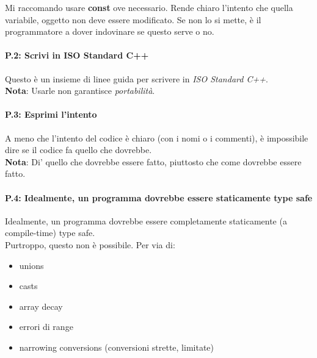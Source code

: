 \textsf{\small Mi raccomando usare \textbf{const} ove necessario. Rende chiaro l'intento che quella variabile, oggetto non deve essere modificato. Se non lo si mette, è il programmatore a dover indovinare se questo serve o no.} \\

\paragraph{P.2: Scrivi in ISO Standard C++}

\label{P_2}

\textsf{\small Questo è un insieme di linee guida per scrivere in \emph{ISO Standard C++}.} \\

\textsf{\small \textbf{Nota}: Usarle non garantisce \emph{portabilità}.} \\

\paragraph{P.3: Esprimi l'intento}

\textsf{\small A meno che l'intento del codice è chiaro (con i nomi o i commenti), è impossibile dire se il codice fa quello che dovrebbe.} \\

\textsf{\small \textbf{Nota}: Di' quello che dovrebbe essere fatto, piuttosto che come dovrebbe essere fatto.} \\

\paragraph{P.4: Idealmente, un programma dovrebbe essere staticamente type safe}

\textsf{\small Idealmente, un programma dovrebbe essere completamente staticamente (a compile-time) type safe.} \\

\textsf{\small Purtroppo, questo non è possibile. Per via di: } 

\begin{multicols}{2}
	\begin{itemize}
		\item \textsf{\small unions}
		\item \textsf{\small casts}
		\item \textsf{\small array decay}
		\item \textsf{\small errori di range}
		\item \textsf{\small narrowing conversions (conversioni strette, limitate)}
	\end{itemize}
\end{multicols}

